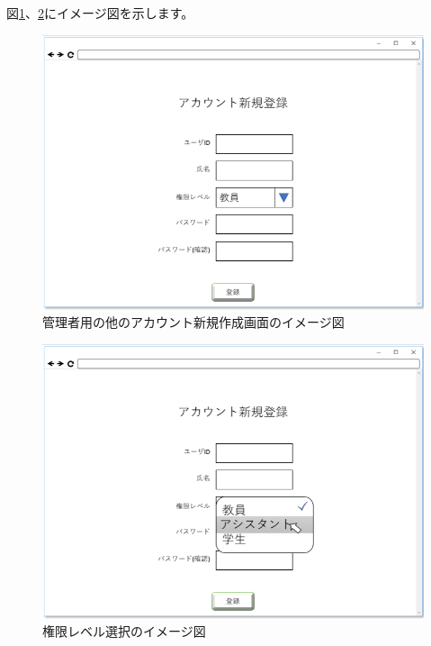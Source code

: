 図\ref{fig:07}、\ref{fig:08}にイメージ図を示します。

\begin{figure}[htbp]
  \begin{center}
    \includegraphics[width=1\linewidth,clip]{./img/07.png}
    \caption{管理者用の他のアカウント新規作成画面のイメージ図}\label{fig:07}
  \end{center}
\end{figure}

\begin{figure}[htbp]
  \begin{center}
    \includegraphics[width=1\linewidth,clip]{./img/08.png}
    \caption{権限レベル選択のイメージ図}\label{fig:08}
  \end{center}
\end{figure}

